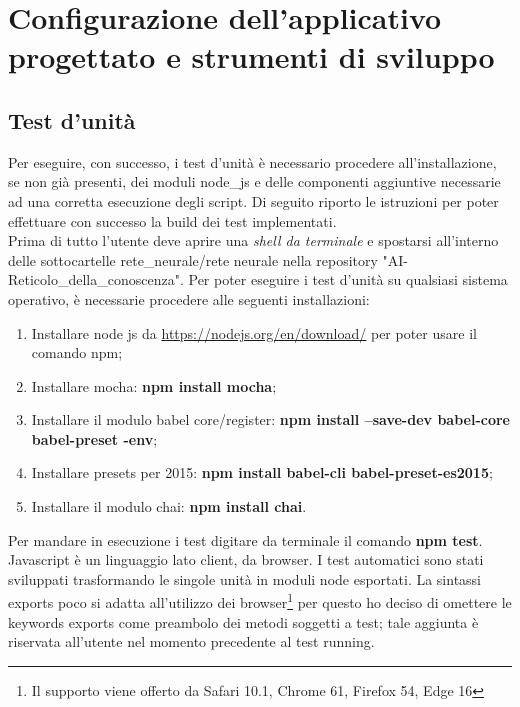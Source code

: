 \section{Configurazione dell'applicativo progettato e strumenti di sviluppo}

\subsection{Test d'unit\`a}
\label{Test d'unita}
Per eseguire, con successo, i test d'unità è necessario procedere all'installazione, se non gi\`a presenti, dei moduli node\_js e delle componenti aggiuntive necessarie ad una corretta esecuzione degli script. Di seguito riporto le istruzioni per poter effettuare con successo la build dei test implementati.\\
Prima di tutto l'utente deve aprire una \textit{shell da terminale} e spostarsi all'interno delle sottocartelle rete\_neurale/rete neurale nella repository "AI-Reticolo\_della\_conoscenza".
Per poter eseguire i test d'unit\`a su qualsiasi sistema operativo, \`e necessarie procedere alle seguenti installazioni:
\begin{enumerate}
 \item Installare node js da \url{https://nodejs.org/en/download/} per poter usare il comando npm;
 \item Installare mocha: \textbf{npm install mocha};
 \item Installare  il modulo babel core/register: \textbf{npm install --save-dev babel-core babel-preset -env};
 \item Installare presets per 2015:  \textbf{npm install babel-cli babel-preset-es2015};
 \item Installare il modulo chai: \textbf{npm install chai}.
\end{enumerate}
\noindent
Per mandare in esecuzione i test digitare da terminale il comando \textbf{npm test}.\\
Javascript \`e un linguaggio lato client, da browser. I test automatici sono stati sviluppati trasformando le singole unit\`a in moduli node esportati. La sintassi exports poco si adatta all'utilizzo dei browser\footnote{Il supporto viene offerto da Safari 10.1, Chrome 61, Firefox 54, Edge 16} per questo ho deciso di omettere le keywords exports come preambolo dei metodi soggetti a test; tale aggiunta \`e riservata all'utente nel momento precedente al test running.

